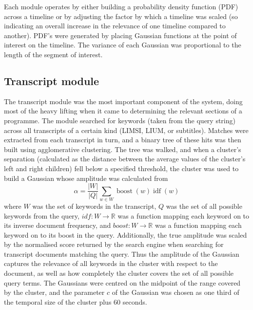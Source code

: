 \documentclass{../acm_proc_article-me11_tweaked}
\begin{document}
Each module operates by either building a probability density function (PDF) across a  timeline or by adjusting the factor by which a timeline was scaled (so indicating an overall increase in the relevance of one timeline compared to another). PDF's were generated by placing Gaussian functions at the point of interest on the timeline. The variance of each Gaussian was proportional to the length of the segment of interest.


\subsection{Transcript module}
The transcript module was the most important component of the system, doing 
most of the heavy lifting when it came to determining the relevant sections 
of a programme. The module searched for keywords (taken from the query string) 
across all transcripts of a certain kind (LIMSI, LIUM, or subtitles). Matches 
were extracted from each transcript in turn, and a binary tree of these hits 
was then built using agglomerative clustering. The tree was walked, and when 
a cluster's separation (calculated as the distance between the average values 
of the cluster's left and right children) fell below a specified threshold, 
the cluster was used to build a Gaussian whose amplitude was calculated from 
\[\alpha = \frac{| W |}{| Q |} \sum_{w \in W} \operatorname{boost}(w) \operatorname{idf}(w)\]
where \(W\) was the set of keywords in the transcript, \(Q\) was the set of 
all possible keywords from the query, \(idf : W \to \mathbb{R}\) was a 
function mapping each keyword on to its inverse document frequency, and 
\(boost : W \to \mathbb{R}\) was a function mapping each keyword on to its 
boost in the query. Additionally, the true amplitude was scaled by the 
normalised score returned by the search engine when searching for transcript 
documents matching the query. Thus the amplitude of the Gaussian captures the 
relevance of all keywords in the cluster with respect to the document, as well 
as how completely the cluster covers the set of all possible query terms. The 
Gaussians were centred on the midpoint of the range covered by the cluster, 
and the parameter \(c\) of the Gaussian was chosen as one third of the 
temporal size of the cluster plus 60 seconds.
\end{document}
